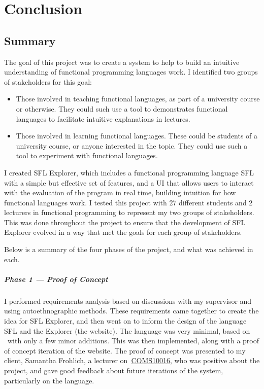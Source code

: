 \chapter{Conclusion}
\label{chap:conclusion}
\section{Summary}
The goal of this project was to create a system to help to build an intuitive understanding of functional programming languages work. I identified two groups of stakeholders for this goal:

\begin{itemize}
    \item Those involved in teaching functional languages, as part of a university course or otherwise. They could such use a tool to demonstrates functional languages to facilitate intuitive explanations in lectures.
    \item Those involved in learning functional languages. These could be students of a university course, or anyone interested in the topic. They could use such a tool to experiment with functional languages. 
\end{itemize}

\noindent I created SFL Explorer, which includes a functional programming language \ac{SFL} with a simple but effective set of features, and a UI that allows users to interact with the evaluation of the program in real time, building intuition for how functional languages work. I tested this project with 27 different students and 2 lecturers in functional programming to represent my two groups of stakeholders. This was done throughout the project to ensure that the development of SFL Explorer  evolved in a way that met the goals for each group of stakeholders. 

Below is a summary of the four phases of the project, and what was achieved in each. 
\paragraph{Phase 1 --- Proof of Concept} I performed requirements analysis based on discussions with my supervisor and using autoethnographic methods. These requirements came together to create the idea for SFL Explorer, and then went on to inform the design of the language \ac{SFL} and the Explorer (the website). The language was very minimal, based on \lcalc~with only a few minor additions. This was then implemented, along with a proof of concept iteration of the website. The proof of concept was presented to my client, Samantha Frohlich, a lecturer on~\hyperref[COMS10016]{COMS10016}, who was positive about the project, and gave good feedback about future iterations of the system, particularly on the language. 
